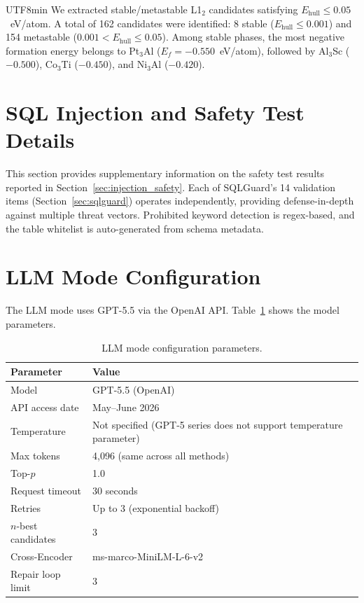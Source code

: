 \documentclass[sn-mathphys,Numbered]{sn-jnl}
\begin{document}
\begin{CJK}{UTF8}{min}
We extracted stable/metastable L1$_2$ candidates satisfying
$E_\text{hull} \leq 0.05$~eV/atom.
A total of 162 candidates were identified: 8 stable
($E_\text{hull} \leq 0.001$) and 154 metastable
($0.001 < E_\text{hull} \leq 0.05$).
Among stable phases, the most negative formation energy belongs to
Pt$_3$Al ($E_f = -0.550$~eV/atom), followed by
Al$_3$Sc ($-0.500$), Co$_3$Ti ($-0.450$), and
Ni$_3$Al ($-0.420$).

\section{SQL Injection and Safety Test Details}
\label{sec:sup_injection}

This section provides supplementary information on the safety test
results reported in Section~\ref{sec:injection_safety}.
Each of SQLGuard's 14 validation items
(Section~\ref{sec:sqlguard}) operates independently, providing
defense-in-depth against multiple threat vectors.
Prohibited keyword detection is regex-based, and the table
whitelist is auto-generated from schema metadata.

\section{LLM Mode Configuration}
\label{sec:sup_llm_config}

The LLM mode uses GPT-5.5 via the OpenAI API.
Table~\ref{tab:sup_llm_params} shows the model parameters.

\begin{table}[htbp]
  \centering
  \caption{LLM mode configuration parameters.}
  \label{tab:sup_llm_params}
  \small
  \begin{tabular}{ll}
    \toprule
    Parameter & Value \\
    \midrule
    Model & GPT-5.5 (OpenAI) \\
    API access date & May--June 2026 \\
    Temperature & Not specified (GPT-5 series does not support temperature parameter) \\
    Max tokens & 4{,}096 (same across all methods) \\
    Top-$p$ & 1.0 \\
    Request timeout & 30 seconds \\
    Retries & Up to 3 (exponential backoff) \\
    $n$-best candidates & 3 \\
    Cross-Encoder & ms-marco-MiniLM-L-6-v2 \\
    Repair loop limit & 3 \\
    \bottomrule
  \end{tabular}
\end{table}


\end{CJK}
\end{document}
